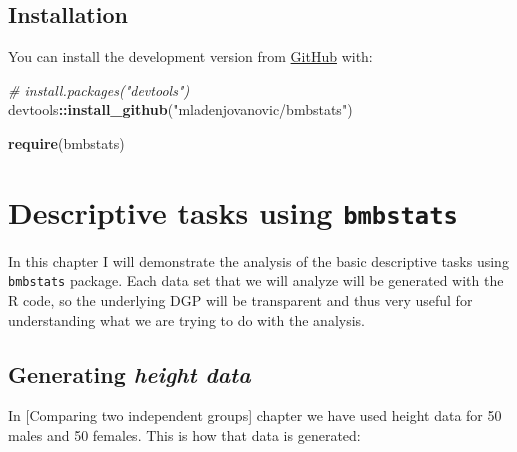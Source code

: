 \documentclass[
]{book}
\newenvironment{Shaded}{\begin{snugshade}}{\end{snugshade}}
\newcommand{\CommentTok}[1]{\textcolor[rgb]{0.56,0.35,0.01}{\textit{#1}}}
\newcommand{\KeywordTok}[1]{\textcolor[rgb]{0.13,0.29,0.53}{\textbf{#1}}}
\newcommand{\NormalTok}[1]{#1}
\newcommand{\OperatorTok}[1]{\textcolor[rgb]{0.81,0.36,0.00}{\textbf{#1}}}
\newcommand{\StringTok}[1]{\textcolor[rgb]{0.31,0.60,0.02}{#1}}
\begin{document}
\hypertarget{installation}{%
\section{Installation}\label{installation}}

You can install the development version from \href{https://github.com/mladenjovanovic/bmbstats}{GitHub} with:

\begin{Shaded}
\begin{Highlighting}[]
\CommentTok{\# install.packages("devtools")}
\NormalTok{devtools}\OperatorTok{::}\KeywordTok{install\_github}\NormalTok{(}\StringTok{"mladenjovanovic/bmbstats"}\NormalTok{)}

\KeywordTok{require}\NormalTok{(bmbstats)}
\end{Highlighting}
\end{Shaded}

\hypertarget{descriptive-tasks-using-bmbstats}{%
\chapter{\texorpdfstring{Descriptive tasks using \texttt{bmbstats}}{Descriptive tasks using bmbstats}}\label{descriptive-tasks-using-bmbstats}}

In this chapter I will demonstrate the analysis of the basic descriptive tasks using \texttt{bmbstats} package. Each data set that we will analyze will be generated with the R code, so the underlying DGP will be transparent and thus very useful for understanding what we are trying to do with the analysis.

\hypertarget{generating-height-data}{%
\section{\texorpdfstring{Generating \emph{height data}}{Generating height data}}\label{generating-height-data}}

In {[}Comparing two independent groups{]} chapter we have used height data for 50 males and 50 females. This is how that data is generated:
\end{document}
